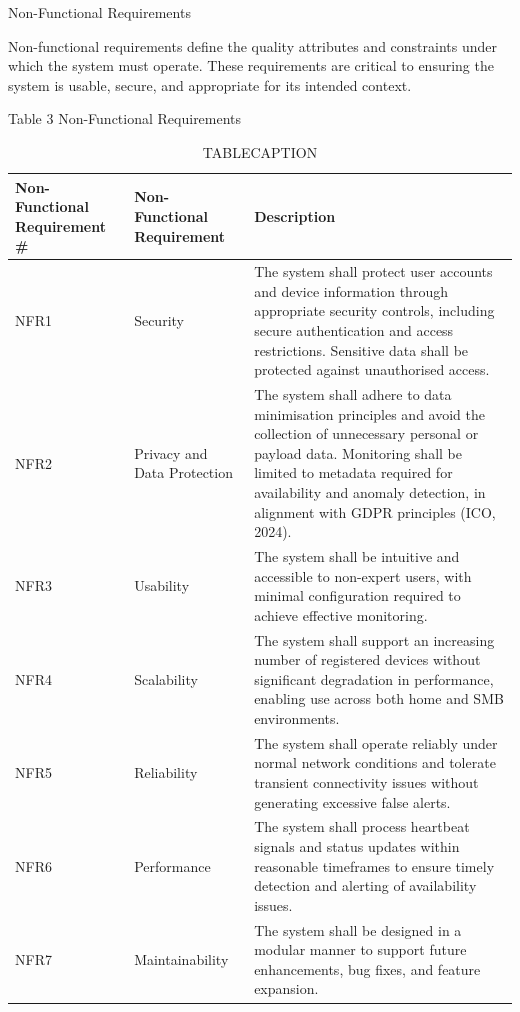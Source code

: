 Non-Functional Requirements

Non-functional requirements define the quality attributes and constraints under which the system must operate. These requirements are critical to ensuring the system is usable, secure, and appropriate for its intended context.

Table 3 Non-Functional Requirements

\begin{table}[htbp]
  \centering
  \small
  \caption{TABLECAPTION}
  \label{tab:ICA1PLACEHOLDER}
\begin{tabular}{p{}p{}p{}}
\toprule
Non-Functional Requirement \# & Non-Functional Requirement & Description \\
\midrule
NFR1 & Security & The system shall protect user accounts and device information through appropriate security controls, including secure authentication and access restrictions. Sensitive data shall be protected against unauthorised access. \\
\midrule
NFR2 & Privacy and Data Protection & The system shall adhere to data minimisation principles and avoid the collection of unnecessary personal or payload data. Monitoring shall be limited to metadata required for availability and anomaly detection, in alignment with GDPR principles (ICO, 2024). \\
\midrule
NFR3 & Usability & The system shall be intuitive and accessible to non-expert users, with minimal configuration required to achieve effective monitoring. \\
\midrule
NFR4 & Scalability & The system shall support an increasing number of registered devices without significant degradation in performance, enabling use across both home and SMB environments. \\
\midrule
NFR5 & Reliability & The system shall operate reliably under normal network conditions and tolerate transient connectivity issues without generating excessive false alerts. \\
\midrule
NFR6 & Performance & The system shall process heartbeat signals and status updates within reasonable timeframes to ensure timely detection and alerting of availability issues. \\
\midrule
NFR7 & Maintainability & The system shall be designed in a modular manner to support future enhancements, bug fixes, and feature expansion. \\
\bottomrule
\end{tabular}
\end{table}

